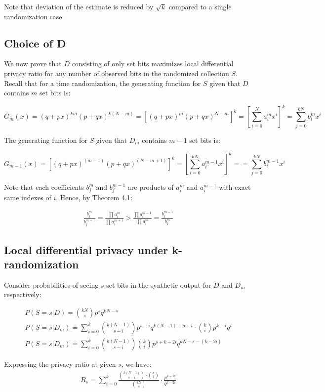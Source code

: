\documentclass[11pt,draft]{article}
\begin{document}
Note that deviation of the estimate is reduced by $\sqrt{k}$ compared to a single randomization case.

\subsection{Choice of D}

We now prove that $D$ consisting of only set bits maximizes local differential privacy ratio for any number of observed bits in the randomized collection $S$.  Recall that for a time randomization, the generating function for $S$ given that $D$ contains $m$ set bits is:

\[
G_m(x) = (q + px)^{km} (p + qx)^{k(N-m)} =  [(q + px)^{m} (p + qx)^{N-m}]^k = \left [ \sum_{i=0}^{N} a_i^mx^i \right ]^k =  \sum_{j=0}^{kN} b_i^mx^i
\]

The generating function for $S$ given that $D_m$ contains $m-1$ set bits is:

\[
G_{m-1}(x) = [(q + px)^{(m-1)} (p + qx)^{(N-m+1)}]^k =  \left [  \sum_{i=0}^{kN} a_i^{m-1}x^i \right ]^k = =  \sum_{j=0}^{kN} b_i^{m-1}x^i
\]

Note that each coefficients $b^m_j$ and $b_j^{m-1}$ are products of $a^m_i$ and $a^{m-1}_i$ with exact same indexes of $i$.  Hence, by Theorem 4.1:

\begin{align}
\frac{b_j^m}{b_j^{m+1}}  = \frac{\prod{a_i^m}}{\prod{a_i^{m+1}}}>   \frac{\prod{a_i^{m-1}}}{\prod{a_i^{m}}} = \frac{b_j^{m-1}}{b_j^{m}}
\end{align}

\subsection{Local differential privacy under k-randomization}

Consider probabilities of seeing $s$ set bits in the synthetic output for $D$ and $D_m$ respectively:

\begin{align}
P(S=s | D ) = \binom{kN}{s}p^sq^{kN-s} \\
P(S=s | D_m ) = \sum_{i=0}^{k} \binom{k(N-1)}{s - i}p^{s-i}q^{k(N-1) - s + i} \cdot \binom{k}{i}p^{k-i}q^{i}  \\
P(S=s | D_m ) = \sum_{i=0}^{k}  \binom{k(N-1)}{s - i} \binom{k}{i} p^{s+k - 2i} q^{kN - s - (k-2i)}
\end{align}

Expressing the privacy ratio at given $s$, we have:
\begin{align}
R_s =  \sum_{i=0}^{k}  \frac{ \binom{k(N-1)}{s - i} \cdot \binom{k}{i} }{  \binom{kN}{s} }  \cdot \frac{p^{k-2i}} {q^{k-2i}}
\end{align}
\end{document}
